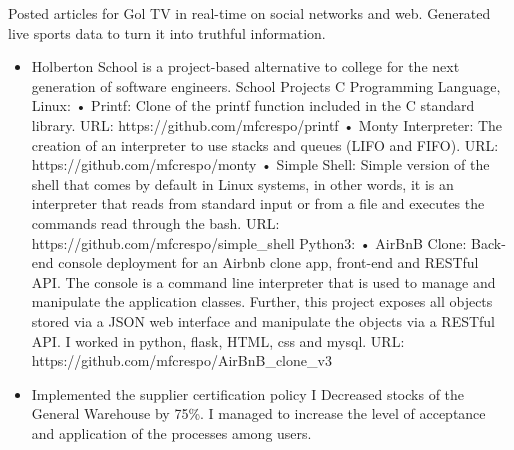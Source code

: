 \documentclass[paper=a4,fontsize=10pt,ragged2e,withhyper]{altacv}%
\begin{document}
\begin{paracol}{2}
\begin{itemize}
Posted articles for Gol TV in real{-}time on social networks and web.\newline%
Generated live sports data to turn it into truthful information. 
\end{itemize}
\divider
{}
\begin{itemize}
 \item Holberton School is a project{-}based alternative to college for the next generation of software engineers.\newline%
School Projects\newline%
C Programming Language, Linux:\newline%
• Printf: Clone of the printf function included in the C standard library.\newline%
URL: https://github.com/mfcrespo/printf\newline%
• Monty Interpreter: The creation of an interpreter to use stacks and queues (LIFO and FIFO).\newline%
URL: https://github.com/mfcrespo/monty\newline%
• Simple Shell: Simple version of the shell that comes by default in Linux systems, in other words, it is an interpreter that reads from standard input or from a file and executes the commands read through the bash.\newline%
URL: https://github.com/mfcrespo/simple\_shell\newline%
Python3:\newline%
• AirBnB Clone: Back{-}end console deployment for an Airbnb clone app, front{-}end and RESTful API. The console is a command line interpreter that is used to manage and manipulate the application classes. Further, this project exposes all objects stored via a JSON web interface and manipulate the objects via a RESTful API. I worked in python, flask, HTML, css and mysql.\newline%
URL: https://github.com/mfcrespo/AirBnB\_clone\_v3 
\end{itemize}
\divider
{}
\begin{itemize}
 \item Implemented the supplier certification policy\newline%
I Decreased stocks of the General Warehouse by 75\%.\newline%
I managed to increase the level of acceptance and application of the processes among users.\newline%

\end{itemize}
\end{paracol}
\end{document}
